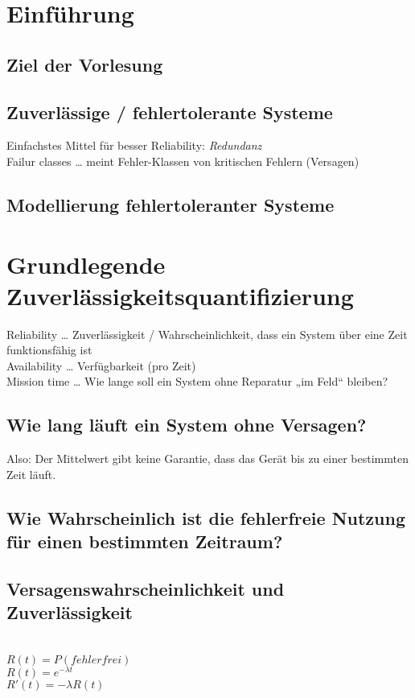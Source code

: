 \section{Einführung}
\subsection*{Ziel der Vorlesung}
\subsection{Zuverlässige / fehlertolerante Systeme}
Einfachstes Mittel für besser Reliability: \emph{Redundanz}\\
Failur classes … meint Fehler-Klassen von kritischen Fehlern (Versagen)
\subsection{Modellierung fehlertoleranter Systeme}

\section{Grundlegende Zuverlässigkeitsquantifizierung}
Reliability … Zuverlässigkeit / Wahrscheinlichkeit, dass ein System über eine Zeit funktionsfähig ist\\
Availability … Verfügbarkeit (pro Zeit)\\
Mission time … Wie lange soll ein System ohne Reparatur „im Feld“ bleiben?

\subsection{Wie lang läuft ein System ohne Versagen?}
Also: Der Mittelwert gibt keine Garantie, dass das Gerät bis zu einer bestimmten Zeit läuft.

\subsection{Wie Wahrscheinlich ist die fehlerfreie Nutzung für einen bestimmten Zeitraum?}

\subsection{Versagenswahrscheinlichkeit und Zuverlässigkeit}
\\
$R(t)=P(fehlerfrei)$\\
$R(t)=e^{-\lambda t}$\\
$R'(t)=-\lambda R(t)$

